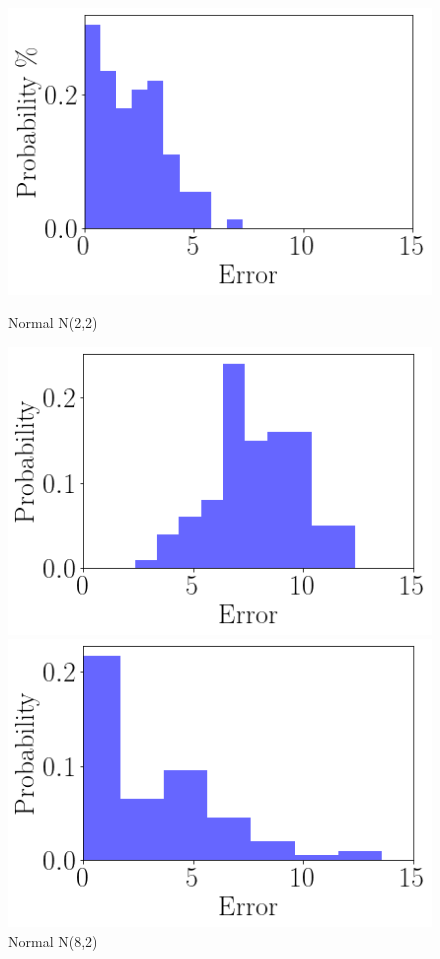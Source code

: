 \begin{figure}[ht]
\begin{minipage}[b]{0.5\linewidth}
    \includegraphics[width=\linewidth]{./img/distributions/normal_n_2_2_hist.png}
    \caption{Normal N(2,2)}
    \vspace{4ex}
  \end{minipage}%
  \begin{minipage}[b]{0.5\linewidth}
    \centering
    \includegraphics[width=\linewidth]{./img/distributions/normal_n_8_2_hist.png}
    \caption{Normal N(8,2)}
    \vspace{4ex}
  \end{minipage}
  \begin{minipage}[b]{0.5\linewidth}
    \centering
    \includegraphics[width=\linewidth]{./img/distributions/heavy_tailed_2_hist.png}

\end{minipage}
\end{figure}
